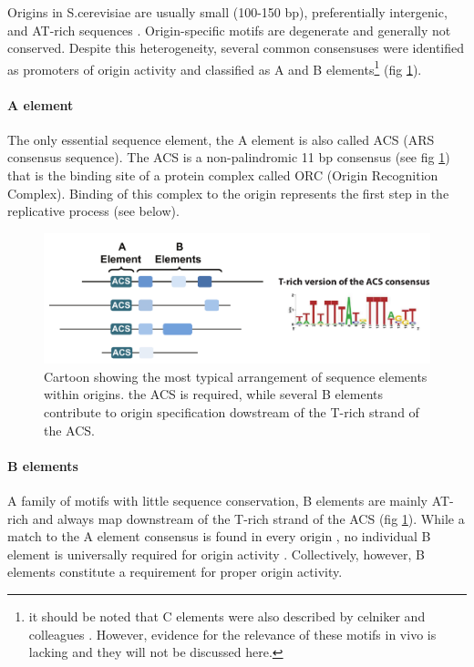 Origins in S.cerevisiae are usually small (100-150 bp), preferentially intergenic, and AT-rich sequences \cite{raghuraman:2016:sequence}. 
Origin-specific motifs are degenerate and generally not conserved. Despite this heterogeneity, several common consensuses were identified as promoters of origin activity and classified as A and B elements\footnote{it should be noted that C elements were also described by celniker and colleagues \cite{celniker:1984:deletion}. However, evidence for the relevance of these motifs in vivo is lacking and they will not be discussed here.} (fig \ref{fig:originSchemaIntro}).


\paragraph{A element}
The only essential sequence element, the A element is also called ACS (ARS consensus sequence). 
The ACS is a non-palindromic 11 bp consensus (see fig \ref{fig:originSchemaIntro})\cite{celniker:1984:deletion,nieduszynski:2006:genomewide} that is the binding site of a protein complex called ORC (Origin Recognition Complex). 
Binding of this complex to the origin represents the first step in the replicative process (see below)\cite{diffley:1992:proteindna}.

\begin{figure}[ht]

\centering
\includegraphics[width=\textwidth]{figures/results/acs}
\caption[ACS consensus and arrangement relative to other origin DNA elements]{Cartoon showing the most typical arrangement of sequence elements within origins. the ACS is required, while several B elements contribute to origin specification dowstream of the T-rich strand of the ACS.}
\label{fig:originSchemaIntro}

\end{figure}

\paragraph{B elements}
A family of motifs with little sequence conservation, B elements are mainly AT-rich and always map downstream of the T-rich strand of the ACS (fig \ref{fig:originSchemaIntro})\cite{raghuraman:2016:sequence}. 
While a match to the A element consensus is found in every origin \cite{celniker:1984:deletion}, no individual B element is universally required for origin activity \cite{marahrens:1992:yeast,lucas:2003:dynamics}. Collectively, however, B elements constitute a requirement for proper origin activity.

